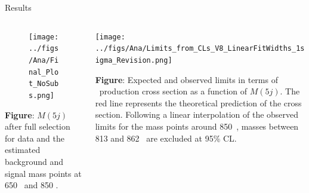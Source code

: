 \begin{frame}{Results}
\vspace{-.2cm}

\begin{columns}
\begin{column}{.50\textwidth}\tiny
\begin{figure}[!Hhtbp]
  \begin{center}
    \texttt{[image: ../figs/Ana/Final\_Plot\_NoSubs.png]}
  \end{center}
\end{figure}

\textbf{Figure}: $M(5j)$ after full selection for data and the estimated background and signal mass points at 650 \GeVcc~and 850 \GeVcc.
\end{column}

\begin{column}{.50\textwidth}\tiny
  \begin{center}
    \texttt{[image: ../figs/Ana/Limits\_from\_CLs\_V8\_LinearFitWidths\_1sigma\_Revision.png]}
  \end{center}
\textbf{Figure}: Expected and observed limits in terms of \Tp~production cross section as a function of $M(5j)$. The red line represents the theoretical prediction of the cross section. Following a linear interpolation of the observed limits for the mass points around 850~\GeVcc, masses between 813 and 862 \GeVcc~are excluded at 95\% CL.
\end{column}

\end{columns}

\end{frame}